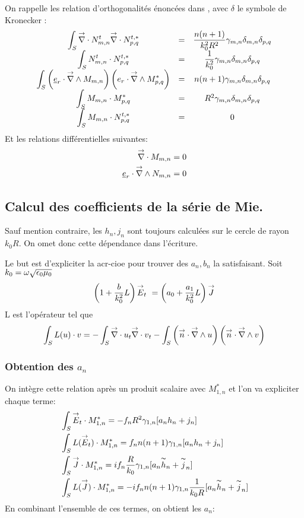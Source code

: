 On rappelle les relation d'orthogonalités énoncées dans \cite{marceaux_high-order_2000}, avec $\delta$ le symbole de Kronecker :
\[
  \begin{matrix}
    \displaystyle\int_S {\overset{\rightarrow}{\nabla}}\cdot N_{m,n}^t {\overset{\rightarrow}{\nabla}}\cdot N_{p,q}^{t,*} &=& \dfrac{n(n+1)}{k_0^2 R^2} \gamma_{m,n} \delta_{m,n} \delta_{p,q}\\
    \displaystyle\int_S N_{m,n}^t \cdot N_{p,q}^{t,*} &=& \dfrac{1}{k_0^2}\gamma_{m,n}\delta_{m,n} \delta_{p,q}\\
    \displaystyle\int_S \left(\underline{e}_r \cdot {\overset{\rightarrow}{\nabla}}\wedge M_{m,n}\right)\left( e_r \cdot {\overset{\rightarrow}{\nabla}}\wedge  M_{p,q}^{*}\right) &=& n(n+1) \gamma_{m,n} \delta_{m,n} \delta_{p,q}\\
    \displaystyle\int_S M_{m,n} \cdot M_{p,q}^{*} &=& R^2 \gamma_{m,n} \delta_{m,n} \delta_{p,q}\\
    \displaystyle\int_S M_{m,n} \cdot N_{p,q}^{t,*} &=& 0
  \end{matrix}
\]
Et les relations différentielles suivantes:
\begin{align*}
  {\overset{\rightarrow}{\nabla}}\cdot M_{m,n} &=0 \\
  \underline{e}_r \cdot {\overset{\rightarrow}{\nabla}}\wedge N_{m,n} &= 0
\end{align*}

\subsection{Calcul des coefficients de la série de Mie.}
\begin{tcolorbox}
Sauf mention contraire, les $h_n,j_n$ sont toujours calculées sur le cercle de rayon $k_0R$. On omet donc cette dépendance dans l'écriture.
\end{tcolorbox}
Le but est d'expliciter la \gls{acr-cioe} pour trouver des $a_n, b_n$ la satisfaisant.
Soit $k_0 = \omega\sqrt{\epsilon_0\mu_0}$
\begin{equation}
  \label{eq:CIOE} \left(1+\dfrac{b}{k_0^2}L\right){\overset{\rightarrow}{E}}_t\ = \left(a_0 + \dfrac{a_1}{k_0^2}L\right){\overset{\rightarrow}{J}}
\end{equation}
L est l'opérateur tel que 
\[
  \int_{S} L(u)\cdot v = - \int_{S} {{\overset{\rightarrow}{\nabla}}\cdot u}_t {{\overset{\rightarrow}{\nabla}}\cdot v}_t - \int_{S}\left({\overset{\rightarrow}{n}} \cdot {\overset{\rightarrow}{\nabla}}\wedge u\right)\left( {\overset{\rightarrow}{n}} \cdot {\overset{\rightarrow}{\nabla}}\wedge v\right)
\]
\subsubsection{Obtention des $a_n$}
On intègre cette relation après un produit scalaire avec $M_{1,n}^{*}$ et l'on va expliciter chaque terme:
\begin{align*}
  &\int_S {\overset{\rightarrow}{E}}_t\cdot M_{1,n}^{*} = - f_n R^2 \gamma_{1,n}[a_n h_n + j_n]\\
  &\int_S L({\overset{\rightarrow}{E}}_t)\cdot M_{1,n}^{*} =  f_n n(n+1)\gamma_{1,n}[a_n h_n + j_n]\\
  &\int_S {\overset{\rightarrow}{J}} \cdot M_{1,n}^{*} =  i f_n \dfrac{R}{k_0} \gamma_{1,n}[a_n \overset{\thicksim}{h}_n + \overset{\thicksim}{j}_n]\\
  &\int_S L({\overset{\rightarrow}{J}}) \cdot M_{1,n}^{*} =  - i f_n n(n+1) \gamma_{1,n}\dfrac{1}{k_0 R}[a_n \overset{\thicksim}{h}_n + \overset{\thicksim}{j}_n]\\
\end{align*}
En combinant l'ensemble de ces termes, on obtient les $a_n$:

